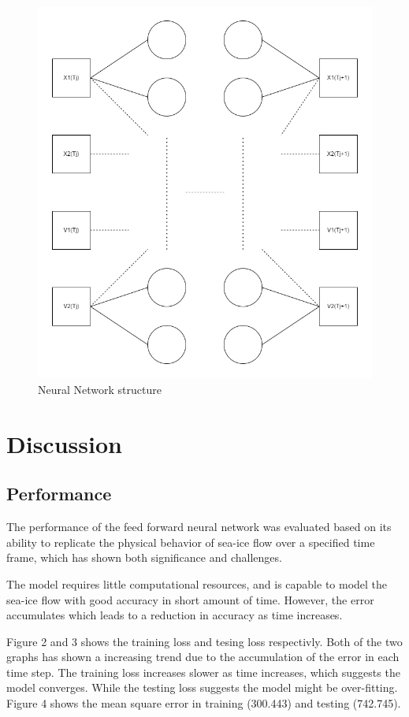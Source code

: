 \documentclass[12pt, a4paper]{article}
\begin{document}
\begin{figure}
    \centering
    \includegraphics[scale=0.5]{../NN_graph.png}
    \caption[]{Neural Network structure}
    \label{fig:neural_network}
\end{figure}

\section{Discussion}
\subsection{Performance}
The performance of the feed forward neural network was evaluated based on its ability to replicate the physical behavior of sea-ice flow over a specified time frame, which has shown both significance and challenges. 

The model requires little computational resources, and is capable to model the sea-ice flow with good accuracy in short amount of time. However, the error accumulates which leads to a reduction in accuracy as time increases.

Figure 2 and 3 shows the training loss and tesing loss respectivly. Both of the two graphs has shown a increasing trend due to the accumulation of the error in each time step. The training loss increases slower as time increases, which suggests the model converges. While the testing loss suggests the model might be over-fitting. Figure 4 shows the mean square error in training (300.443) and testing (742.745).
\end{document}

